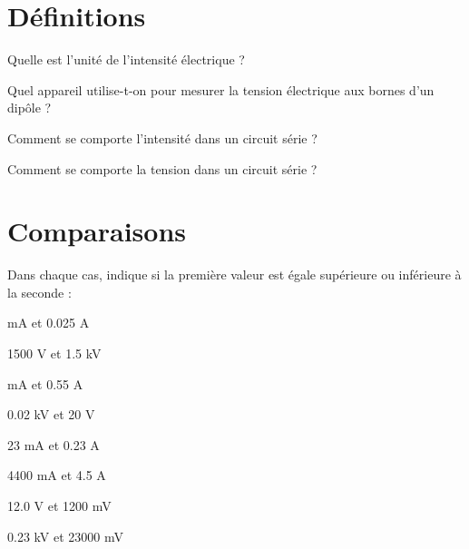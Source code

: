 \section{Définitions}

\begin{questions}
	\question Quelle est l'unité de l'intensité électrique ?
	
	\fillwithdottedlines{1cm}
	
	\question Quel appareil utilise-t-on pour mesurer la tension électrique aux bornes d'un dipôle ?
	\fillwithdottedlines{1cm}
	
	
	\question Comment se comporte l'intensité dans un circuit série ?
	\fillwithdottedlines{3cm}
	
	\question Comment se comporte la tension dans un circuit série ?
	\fillwithdottedlines{3cm}
	
\end{questions}

\section{Comparaisons}

Dans chaque cas, indique si la première valeur est égale supérieure ou inférieure à la seconde :

\begin{multicols}{2}
	\begin{questions}
		 mA et \num{0.025} A\\
		\fillwithdottedlines{1cm}
		
		\question \num{1500} V et \num{1.5} kV \\
		\fillwithdottedlines{1cm}
		
		 mA et \num{0.55} A\\
		\fillwithdottedlines{1cm}
		
		\question \num{0.02} kV et \num{20} V\\
		\fillwithdottedlines{1cm}
		
		\question \num{23} mA et \num{0.23} A\\
		\fillwithdottedlines{1cm}
		
		\question \num{4400} mA et \num{4.5} A\\
		\fillwithdottedlines{1cm}
		
		\question \num{12.0} V et \num{1200} mV\\		
		\fillwithdottedlines{1cm}
		
		\question \num{0.23} kV et \num{23000} mV\\		
		\fillwithdottedlines{1cm}
		
	\end{questions}
	
\end{multicols}

